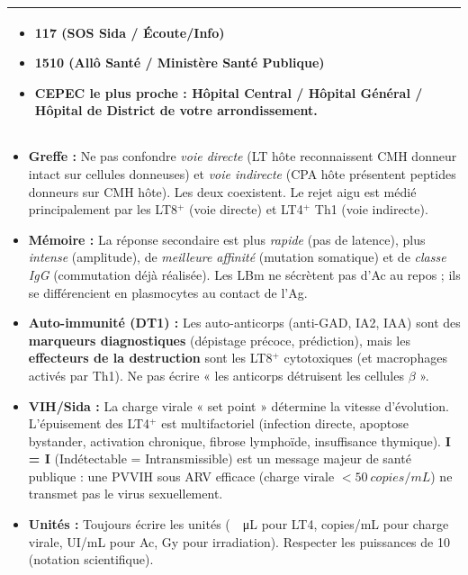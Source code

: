 \documentclass[11pt]{article}
\begin{document}
\begin{exoresolu}
\begin{center}
\begin{tabularx}{\linewidth}{|X|}
\begin{minipage}{\linewidth}
\begin{itemize}
    \item \textbf{117} (SOS Sida / Écoute/Info)
    \item \textbf{1510} (Allô Santé / Ministère Santé Publique)
    \item \textbf{CEPEC le plus proche :} Hôpital Central / Hôpital Général / Hôpital de District de votre arrondissement.
\end{itemize}
\end{minipage} \\ \hline
\end{tabularx}
\end{center}
\end{exoresolu}

\begin{attention}
\begin{itemize}
    \item \textbf{Greffe :} Ne pas confondre \emph{voie directe} (LT hôte reconnaissent CMH donneur intact sur cellules donneuses) et \emph{voie indirecte} (CPA hôte présentent peptides donneurs sur CMH hôte). Les deux coexistent. Le rejet aigu est médié principalement par les LT8$^+$ (voie directe) et LT4$^+$ Th1 (voie indirecte).
    \item \textbf{Mémoire :} La réponse secondaire est plus \emph{rapide} (pas de latence), plus \emph{intense} (amplitude), de \emph{meilleure affinité} (mutation somatique) et de \emph{classe IgG} (commutation déjà réalisée). Les LBm ne sécrètent pas d'Ac au repos ; ils se différencient en plasmocytes au contact de l'Ag.
    \item \textbf{Auto-immunité (DT1) :} Les auto-anticorps (anti-GAD, IA2, IAA) sont des \textbf{marqueurs diagnostiques} (dépistage précoce, prédiction), mais les \textbf{effecteurs de la destruction} sont les LT8$^+$ cytotoxiques (et macrophages activés par Th1). Ne pas écrire « les anticorps détruisent les cellules $\beta$ ».
    \item \textbf{VIH/Sida :} La charge virale « set point » détermine la vitesse d'évolution. L'épuisement des LT4$^+$ est multifactoriel (infection directe, apoptose bystander, activation chronique, fibrose lymphoïde, insuffisance thymique). \textbf{I = I} (Indétectable = Intransmissible) est un message majeur de santé publique : une PVVIH sous ARV efficace (charge virale $< \SI{50}{copies/mL}$) ne transmet pas le virus sexuellement.
    \item \textbf{Unités :} Toujours écrire les unités (\SI{}{\per\micro\liter} pour LT4, copies/mL pour charge virale, UI/mL pour Ac, Gy pour irradiation). Respecter les puissances de 10 (notation scientifique).
\end{itemize}
\end{attention}
\end{document}
